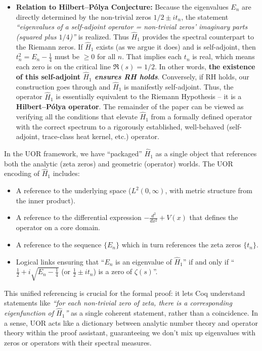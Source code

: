 \documentclass[12pt]{article}
\theoremstyle{plain}
\theoremstyle{definition}
\begin{document}
\begin{itemize}
    \item \textbf{Relation to Hilbert--P\'olya Conjecture:} Because the eigenvalues \(E_n\) are directly determined by the non-trivial zeros \(1/2 \pm it_n\), the statement \emph{``eigenvalues of a self-adjoint operator = non-trivial zeros' imaginary parts (squared plus \(1/4\))''} is realized. Thus \(\hat{H}_1\) provides the spectral counterpart to the Riemann zeros. If \(\hat{H}_1\) exists (as we argue it does) and is self-adjoint, then \(t_n^2 = E_n - \frac{1}{4}\) must be \(\ge0\) for all \(n\). That implies each \(t_n\) is real, which means each zero is on the critical line \(\Re(s)=1/2\). In other words, \textbf{the existence of this self-adjoint \(\hat{H}_1\) \emph{ensures RH holds}}. Conversely, if RH holds, our construction goes through and \(\hat{H}_1\) is manifestly self-adjoint. Thus, the operator \(\hat{H}_1\) is essentially equivalent to the Riemann Hypothesis -- it is a \textbf{Hilbert--P\'olya operator}. The remainder of the paper can be viewed as verifying all the conditions that elevate \(\hat{H}_1\) from a formally defined operator with the correct spectrum to a rigorously established, well-behaved (self-adjoint, trace-class heat kernel, etc.) operator.
\end{itemize}

In the UOR framework, we have ``packaged'' \(\hat{H}_1\) as a single object that references both the analytic (zeta zeros) and geometric (operator) worlds. The UOR encoding of \(\hat{H}_1\) includes:
\begin{itemize}[leftmargin=*, labelsep=5mm]
    \item A reference to the underlying space (\(L^2(0,\infty)\), with metric structure from the inner product).
    \item A reference to the differential expression \(-\frac{d^2}{dx^2} + V(x)\) that defines the operator on a core domain.
    \item A reference to the sequence \(\{E_n\}\) which in turn references the zeta zeros \(\{t_n\}\).
    \item Logical links ensuring that ``\(E_n\) is an eigenvalue of \(\hat{H}_1\)'' if and only if ``\(\frac{1}{2} + i\sqrt{E_n-\frac{1}{4}}\) (or \(\frac{1}{2} \pm it_n\)) is a zero of \(\zeta(s)\)''.
\end{itemize}

This unified referencing is crucial for the formal proof: it lets Coq understand statements like \emph{``for each non-trivial zero of zeta, there is a corresponding eigenfunction of \(\hat{H}_1\)''} as a single coherent statement, rather than a coincidence. In a sense, UOR acts like a dictionary between analytic number theory and operator theory within the proof assistant, guaranteeing we don't mix up eigenvalues with zeros or operators with their spectral measures.
\end{document}
